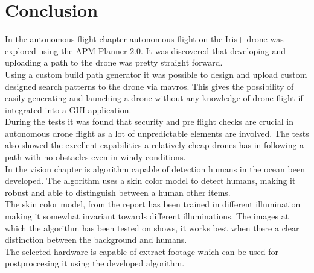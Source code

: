 \chapter{Conclusion}

In the autonomous flight chapter autonomous flight on the Iris+ drone was explored using the APM Planner 2.0. It was discovered that developing and uploading a path to the drone was pretty straight forward.\\

Using a custom build path generator it was possible to design and upload custom designed search patterns to the drone via mavros. This gives the possibility of easily generating and launching a drone without any knowledge of drone flight if integrated into a GUI application.\\

During the tests it was found that security and pre flight checks are crucial in autonomous drone flight as a lot of unpredictable elements are involved. The tests also showed the excellent capabilities a relatively cheap drones has in following a path with no obstacles even in windy conditions.\\

In the vision chapter  is  algorithm capable of detection humans in the ocean been developed.  The algorithm uses a skin color model to detect humans, making it robust and able to distinguish between a human other items.\\
 
The skin color model, from the report \cite{Ref:SkinDetection} has been trained in different illumination making it somewhat invariant towards different illuminations. The images at which the algorithm has been tested on shows, it works best when there a clear distinction between the background and humans.\\

The selected hardware is capable of extract footage  which can be used for postproccesing it using the developed algorithm. 





\newpage